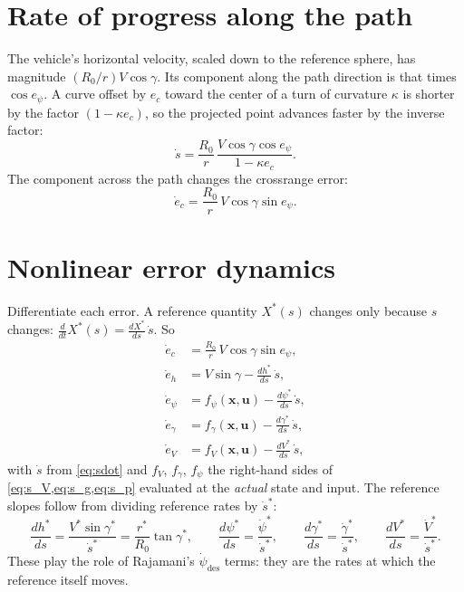 \documentclass[11pt]{report}
\numberwithin{equation}{chapter}
\newcommand{\vb}[1]{\bm{#1}}
\newcommand{\sdot}{\dot s}
\begin{document}
\section{Rate of progress along the path}

The vehicle's horizontal velocity, scaled down to the reference sphere, has magnitude
$(R_0/r)V\cos\gamma$. Its component along the path direction is that times $\cos e_\psi$.
A curve offset by $e_c$ toward the center of a turn of curvature $\kappa$ is shorter by the
factor $(1-\kappa e_c)$, so the projected point advances faster by the inverse factor:
\begin{equation}
  \sdot = \frac{R_0}{r}\,\frac{V\cos\gamma\cos e_\psi}{1 - \kappa e_c} .
  \label{eq:sdot}
\end{equation}
The component across the path changes the crossrange error:
\begin{equation}
  \dot e_c = \frac{R_0}{r}\,V\cos\gamma\sin e_\psi .
  \label{eq:ecdot}
\end{equation}

\section{Nonlinear error dynamics}

Differentiate each error. A reference quantity $X^*(s)$ changes only because $s$ changes:
$\frac{d}{dt}X^*(s) = \frac{dX^*}{ds}\,\sdot$. So
\begin{align}
  \dot e_c &= \frac{R_0}{r}\,V\cos\gamma\sin e_\psi, \label{eq:ne_c}\\
  \dot e_h &= V\sin\gamma - \frac{dh^*}{ds}\,\sdot, \label{eq:ne_h}\\
  \dot e_\psi &= f_\psi(\vb x,\vb u) - \frac{d\psi^*}{ds}\,\sdot, \\
  \dot e_\gamma &= f_\gamma(\vb x,\vb u) - \frac{d\gamma^*}{ds}\,\sdot, \\
  \dot e_V &= f_V(\vb x,\vb u) - \frac{dV^*}{ds}\,\sdot, \label{eq:ne_V}
\end{align}
with $\sdot$ from \cref{eq:sdot} and $f_V$, $f_\gamma$, $f_\psi$ the right-hand sides of
\cref{eq:s_V,eq:s_g,eq:s_p} evaluated at the \emph{actual} state and input. The reference
slopes follow from dividing reference rates by $\sdot^*$:
\begin{equation}
  \frac{dh^*}{ds} = \frac{V^*\sin\gamma^*}{\sdot^*} = \frac{r^*}{R_0}\tan\gamma^*,\qquad
  \frac{d\psi^*}{ds} = \frac{\dot\psi^*}{\sdot^*},\qquad
  \frac{d\gamma^*}{ds} = \frac{\dot\gamma^*}{\sdot^*},\qquad
  \frac{dV^*}{ds} = \frac{\dot V^*}{\sdot^*} .
\end{equation}
These play the role of Rajamani's $\dot\psi_{\text{des}}$ terms: they are the rates at which
the reference itself moves.
\end{document}
